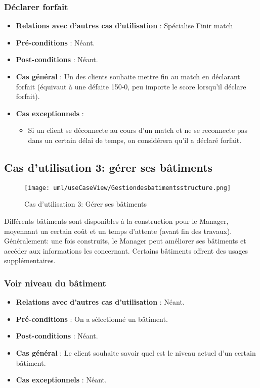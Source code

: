 \documentclass[a4paper,titlepage]{scrreprt}
\begin{document}
    \subsubsection{Déclarer forfait}
      \begin{itemize}
        \item \textbf{Relations avec d'autres cas d'utilisation}  : Spécialise Finir match
        \item \textbf{Pré-conditions} : Néant.
        \item \textbf{Post-conditions} : Néant.
        \item \textbf{Cas général} : Un des clients souhaite mettre fin au match en déclarant forfait (équivaut à une défaite 150-0, peu importe le score lorsqu’il déclare forfait).
        \item \textbf{Cas exceptionnels} :
          \begin{itemize}
            \item Si un client se déconnecte au cours d’un match et ne se reconnecte pas dans un certain délai de temps, on considérera qu’il a déclaré forfait.
          \end{itemize}
      \end{itemize}


  \subsection{Cas d'utilisation 3: gérer ses bâtiments}
    \begin{figure}[H]
    \center
    \texttt{[image: uml/useCaseView/Gestiondesbatimentsstructure.png]}
    \caption{Cas d'utilisation 3: Gérer ses bâtiments}
  \end{figure}	
  Différents bâtiments sont disponibles à la construction pour le Manager, 
  moyennant un certain coût et un temps d'attente (avant fin des travaux). 
  Généralement: une fois construits, le Manager peut améliorer ses bâtiments 
  et accéder aux informations les concernant. Certains bâtiments offrent 
  des usages supplémentaires.
    \subsubsection{Voir niveau du bâtiment}
      \begin{itemize}
        \item \textbf{Relations avec d'autres cas d'utilisation}  : Néant.
        \item \textbf{Pré-conditions} : On a sélectionné un bâtiment.
        \item \textbf{Post-conditions} : Néant.
        \item \textbf{Cas général} : Le client souhaite savoir quel est le niveau actuel d’un certain bâtiment. 
        \item \textbf{Cas exceptionnels} : Néant.
      \end{itemize}
\end{document}
